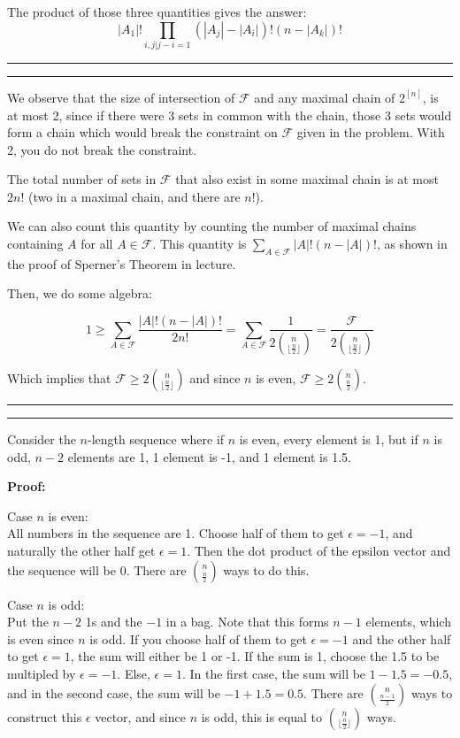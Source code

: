 \documentclass[11pt,letterpaper]{article}
\newcommand{\question}[1] {\vspace{.25in} \hrule\vspace{0.5em}
\noindent{\bf #1} \vspace{0.5em}
\hrule \vspace{.10in}}
\begin{document}
The product of those three quantities gives the answer:
$$|A_1|!\prod_{i,j | j-i = 1} (|A_j| - |A_i|)!(n - |A_k|)!$$

\question{2}
We observe that the size of intersection of $\mathcal{F}$ and any maximal chain of $2^{[n]}$,
is at most 2, since if there were 3 sets in common with the chain,
those 3 sets would form a chain which would break the constraint on $\mathcal{F}$ given in the problem.
With 2, you do not break the constraint.

The total number of sets in $\mathcal{F}$ that also exist in some maximal chain is at most $2n!$ (two in a maximal chain, and there are $n!$).

We can also count this quantity by counting the number of maximal chains containing $A$ for all $A \in \mathcal{F}$. This quantity is $\sum_{A \in \mathcal{F}} |A|!(n-|A|)!$, as shown in the proof of Sperner's Theorem in lecture.

Then, we do some algebra:

$$ 1 \geq \sum_{A \in \mathcal{F}} \frac{|A|!(n-|A|)!}{2n!} = \sum_{A \in \mathcal{F}} \frac{1}{2{n \choose \lfloor \frac{n}{2} \rfloor }} = \frac{\mathcal{F}}{2{n \choose \lfloor \frac{n}{2} \rfloor }}$$

Which implies that $\mathcal{F} \geq 2{n \choose \lfloor \frac{n}{2} \rfloor }$ and since $n$ is even, $\mathcal{F} \geq 2{n \choose \frac{n}{2}}$.


\question{3}
Consider the $n$-length sequence where if $n$ is even, every element is 1, but if $n$ is odd, $n-2$ elements are 1, 1 element is -1, and 1 element is 1.5.

\textbf{Proof:}

Case $n$ is even:\\
All numbers in the sequence are 1. Choose half of them to get $\epsilon = -1$, and naturally the other half get $\epsilon = 1$.
Then the dot product of the epsilon vector and the sequence will be $0$. There are ${n \choose \frac{n}{2}}$ ways to do this.

Case $n$ is odd:\\
Put the $n-2$ 1s and the $-1$ in a bag. Note that this forms $n-1$ elements, which is even since $n$ is odd.
If you choose half of them to get $\epsilon = -1$ and the other half to get $\epsilon = 1$, the sum will either be 1 or -1.
If the sum is 1, choose the 1.5 to be multipled by $\epsilon = -1$. Else, $\epsilon = 1$. In the first case, the sum will be $1-1.5 = -0.5$, and in the second case, the sum will be $-1+1.5 = 0.5$.
There are ${n \choose \frac{n-1}{2}}$ ways to construct this $\epsilon$ vector, and since $n$ is odd, this is equal to ${n \choose \lfloor \frac{n}{2} \rfloor}$ ways.
\end{document}
